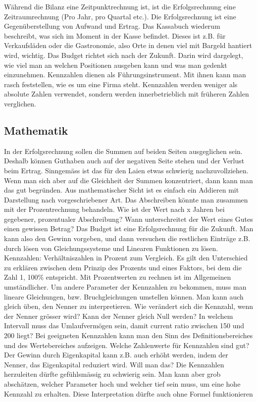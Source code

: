 \documentclass[11pt, twocolumn, a4paper]{scrartcl}
\begin{document}
Während die Bilanz eine Zeitpunktrechnung ist, ist die Erfolgsrechnung eine Zeitraumrechnung (Pro Jahr, pro Quartal etc.). Die Erfolgsrechnung ist eine Gegenüberstellung von Aufwand und Ertrag. Das Kassabuch wiederum beschreibt, was sich im Moment in der Kasse befindet. Dieses ist z.B. für Verkaufsläden oder die Gastronomie, also Orte in denen viel mit Bargeld hantiert wird, wichtig.  Das Budget richtet sich nach der Zukunft. Darin wird dargelegt, wie viel man an welchen Positionen ausgeben kann und was man gedenkt einzunehmen.
Kennzahlen dienen als Führungsinstrument. Mit ihnen kann man rasch feststellen, wie es um eine Firma steht. Kennzahlen werden weniger als absolute Zahlen verwendet, sondern werden innerbetrieblich mit früheren Zahlen verglichen.
\subsection{Mathematik}

In der Erfolgsrechnung sollen die Summen auf beiden Seiten ausgeglichen sein. Deshalb können Guthaben auch auf der \flqq negativen\frqq{} Seite stehen und der Verlust beim Ertrag. Sinngemäss ist das für den Laien etwas schwierig nachzuvollziehen. Wenn man sich aber auf die Gleichheit der Summen konzentriert, dann kann man das gut begründen.
Aus mathematischer Sicht ist es einfach ein Addieren mit Darstellung nach vorgeschriebener Art. Das Abschreiben könnte man zusammen mit der Prozentrechnung behandeln. Wie ist der Wert nach x Jahren bei gegebener, prozentualer Abschreibung? Wann unterschreitet der Wert eines Gutes einen gewissen Betrag? Das Budget ist eine Erfolgsrechnung für die Zukunft. Man kann also den Gewinn vorgeben, und dann versuchen die restlichen Einträge z.B. durch lösen von Gleichungssysteme und Linearen Funktionen zu lösen. Kennzahlen: Verhältniszahlen in Prozent zum Vergleich. Es gilt den Unterschied zu erklären zwischen dem Prinzip des Prozents und eines Faktors, bei dem die Zahl 1, 100\% entspricht. Mit Prozentwerten zu rechnen ist im Allgemeinen umständlicher. Um andere Parameter der Kennzahlen zu bekommen, muss man lineare Gleichungen, bzw. Bruchgleichungen umstellen können. Man kann auch gleich üben, den Nenner zu interpretieren. Wie verändert sich die Kennzahl, wenn der Nenner grösser wird? Kann der Nenner gleich Null werden? In welchem Intervall muss das Umlaufvermögen sein, damit \flqq current ratio\frqq{} zwischen 150 und 200 liegt? Bei geeigneten Kennzahlen kann man den Sinn des Definitionsbereiches und des Wertebereiches aufzeigen. Welche Zahlenwerte für Kennzahlen sind gut?
Der Gewinn durch Eigenkapital kann z.B. auch erhöht werden, indem der Nenner, das Eigenkapital reduziert wird. Will man das?
Die Kennzahlen herzuleiten dürfte gefühlsmässig zu schwierig sein. Man kann aber grob abschätzen, welcher Parameter hoch und welcher tief sein muss, um eine hohe Kennzahl zu erhalten. Diese Interpretation dürfte auch ohne Formel funktionieren
\end{document}
